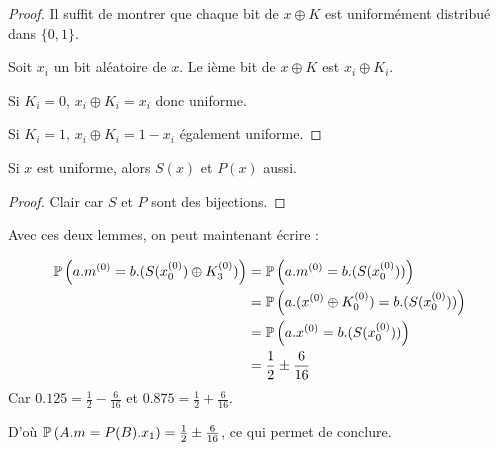 \begin{proof}
	Il suffit de montrer que chaque bit de $x \oplus K$ est uniformément distribué dans $\{0,1\}$.

	Soit $x_i$ un bit aléatoire de $x$. Le ième bit de $x \oplus K$ est $x_i \oplus K_i$.

	Si $K_i = 0$, $x_i \oplus K_i = x_i$ donc uniforme.

	Si $K_i = 1$, $x_i \oplus K_i = 1 - x_i$ également uniforme. 
\end{proof}

\begin{lemma}
	Si $x$ est uniforme, alors $S(x)$ et $P(x)$ aussi.
\end{lemma}
\begin{proof}
	Clair car $S$ et $P$ sont des bijections.
\end{proof}

Avec ces deux lemmes, on peut maintenant écrire :

\begin{align*}
\mathbb{P}\left( a.m^{(0)}= b.(S(x_0^{(0)}) \oplus K_3^{(0)}) \right) &= \mathbb{P}\left( a.m^{(0)} = b.(S(x_0^{(0)})) \right) \\
													&= \mathbb{P}\left( a.(x^{(0)} \oplus K_0^{(0)}) =  b.(S(x_0^{(0)})) \right) \\
													&= \mathbb{P}\left( a.x^{(0)} = b.(S(x_0^{(0)})) \right) \\
													&= \frac{1}{2} \pm \frac{6}{16}
\end{align*}
Car $0.125 = \frac{1}{2} - \frac{6}{16}$ et $0.875 = \frac{1}{2} + \frac{6}{16}$.

D'où $\mathbb{P}\left( A.m = P(B).x_1 \right) = \frac{1}{2} \pm \frac{6}{16}$, ce qui permet de conclure.



